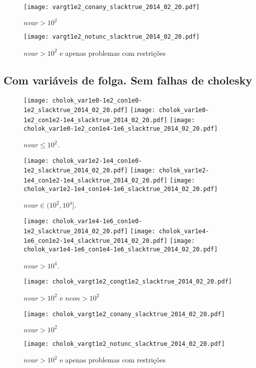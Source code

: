 \documentclass{article}
\begin{document}
\begin{figure}[H]
\centering
\texttt{[image: vargt1e2\_conany\_slacktrue\_2014\_02\_20.pdf]}
\caption{ $nvar > 10^2$ }
\label{fig:nvar_medium_and_big}
\end{figure}

\begin{figure}[H]
\centering
\texttt{[image: vargt1e2\_notunc\_slacktrue\_2014\_02\_20.pdf]}
\caption{ $nvar > 10^2$ e apenas problemas com restrições }
\label{fig:nvar_medium_and_big_not_unc}
\end{figure}

\newpage
\subsection{Com variáveis de folga. Sem falhas de cholesky}

\begin{figure}[H]
\centering
\texttt{[image: cholok\_var1e0-1e2\_con1e0-1e2\_slacktrue\_2014\_02\_20.pdf]}
\texttt{[image: cholok\_var1e0-1e2\_con1e2-1e4\_slacktrue\_2014\_02\_20.pdf]}
\texttt{[image: cholok\_var1e0-1e2\_con1e4-1e6\_slacktrue\_2014\_02\_20.pdf]}
\caption{ $nvar \leq 10^2$. }
\label{fig:nvar_small}
\end{figure}
\begin{figure}[H]
\centering
\texttt{[image: cholok\_var1e2-1e4\_con1e0-1e2\_slacktrue\_2014\_02\_20.pdf]}
\texttt{[image: cholok\_var1e2-1e4\_con1e2-1e4\_slacktrue\_2014\_02\_20.pdf]}
\texttt{[image: cholok\_var1e2-1e4\_con1e4-1e6\_slacktrue\_2014\_02\_20.pdf]}
\caption{ $nvar \in (10^2,10^4]$. }
\label{fig:nvar_medium}
\end{figure}
\begin{figure}[H]
\centering
\texttt{[image: cholok\_var1e4-1e6\_con1e0-1e2\_slacktrue\_2014\_02\_20.pdf]}
\texttt{[image: cholok\_var1e4-1e6\_con1e2-1e4\_slacktrue\_2014\_02\_20.pdf]}
\texttt{[image: cholok\_var1e4-1e6\_con1e4-1e6\_slacktrue\_2014\_02\_20.pdf]}
\caption{ $nvar > 10^4$. }
\label{fig:nvar_big}
\end{figure}

\begin{figure}[H]
\centering
\texttt{[image: cholok\_vargt1e2\_congt1e2\_slacktrue\_2014\_02\_20.pdf]}
\caption{ $nvar > 10^2$ e $ncon > 10^2$ }
\label{fig:both_medium_and_big}
\end{figure}

\begin{figure}[H]
\centering
\texttt{[image: cholok\_vargt1e2\_conany\_slacktrue\_2014\_02\_20.pdf]}
\caption{ $nvar > 10^2$ }
\label{fig:nvar_medium_and_big}
\end{figure}

\begin{figure}[H]
\centering
\texttt{[image: cholok\_vargt1e2\_notunc\_slacktrue\_2014\_02\_20.pdf]}
\caption{ $nvar > 10^2$ e apenas problemas com restrições }
\label{fig:nvar_medium_and_big_not_unc}
\end{figure}
\end{document}
